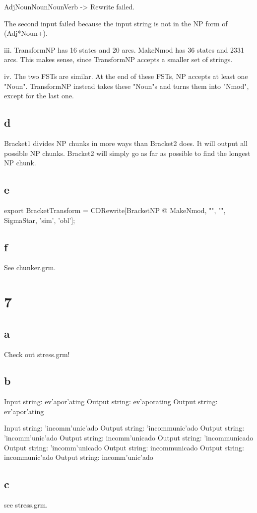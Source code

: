 \documentclass[12pt, letterpaper]{article}
\begin{document}
AdjNounNounNounVerb -> Rewrite failed.

The second input failed because the input string is not in the NP form of (Adj*Noun+).

iii. TransformNP has 16 states and 20 arcs. MakeNmod has 36 states and 2331 arcs. This makes sense, since TransformNP accepts a smaller set of strings. 

iv. The two FSTs are similar. At the end of these FSTs, NP accepts at least one "Noun". TransformNP instead takes these "Noun"s and turns them into "Nmod", except for the last one. 

\subsection{d}
Bracket1 divides NP chunks in more ways than Bracket2 does. It will output all possible NP chunks. Bracket2 will simply go as far as possible to find the longest NP chunk.

\subsection{e}
export BracketTransform = CDRewrite[BracketNP @ MakeNmod, "", "", SigmaStar, 'sim', 'obl'];

\subsection{f}
See chunker.grm.

\section{7}
\subsection{a}
Check out stress.grm!

\subsection{b}
Input string: ev'apor'ating
Output string: ev'aporating
Output string: ev'apor'ating

Input string: 'incomm'unic'ado
Output string: 'incommunic'ado
Output string: 'incomm'unic'ado
Output string: incomm'unicado
Output string: 'incommunicado
Output string: 'incomm'unicado
Output string: incommunicado
Output string: incommunic'ado
Output string: incomm'unic'ado

\subsection{c}
see stress.grm.
\end{document}
